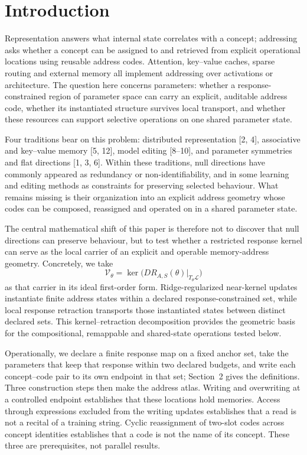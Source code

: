 \documentclass[11pt]{article}
\begin{document}
\section{Introduction}

Representation answers what internal state correlates with a concept; addressing asks whether a concept can
be assigned to and retrieved from explicit operational locations using reusable address codes. Attention, key--value caches,
sparse routing and external memory all implement addressing over activations or architecture. The question here concerns parameters: whether a response-constrained region of parameter space can
carry an explicit, auditable address code, whether its instantiated structure survives local transport, and
whether these resources can support selective operations on one shared parameter state.

Four traditions bear on this problem: distributed representation [2, 4], associative and key--value memory
[5, 12], model editing [8--10], and parameter symmetries and flat directions [1, 3, 6]. Within these traditions,
null directions have commonly appeared as redundancy or non-identifiability, and in some learning and editing
methods as constraints for preserving selected behaviour. What remains missing is their organization into an
explicit address geometry whose codes can be composed, reassigned and operated on in a shared parameter state.

The central mathematical shift of this paper is therefore not to discover that null directions can preserve
behaviour, but to test whether a restricted response kernel can serve as the local carrier of an explicit and
operable memory-address geometry. Concretely, we take
\begin{equation}
\mathcal{V}_\theta=\ker\bigl(DR_{A,S}(\theta)\big|_{T_\theta\mathcal{L}}\bigr)
\end{equation}
as that carrier in its ideal first-order form. Ridge-regularized near-kernel updates instantiate finite address
states within a declared response-constrained set, while local response retraction transports those
instantiated states between distinct declared sets. This kernel--retraction decomposition
provides the geometric basis for the compositional, remappable and shared-state operations tested below.

Operationally, we declare a finite response map on a fixed anchor set, take the parameters that keep that response within two
declared budgets, and write each concept--code pair to its own endpoint in that set; Section~2 gives the
definitions. Three construction steps then make the address atlas. Writing and overwriting
at a controlled endpoint establishes that these locations hold memories. Access through expressions excluded
from the writing updates establishes that a read is not a recital of a training string. Cyclic reassignment of
two-slot codes across concept identities establishes that a code is not the name of its concept. These three
are prerequisites, not parallel results.
\end{document}
